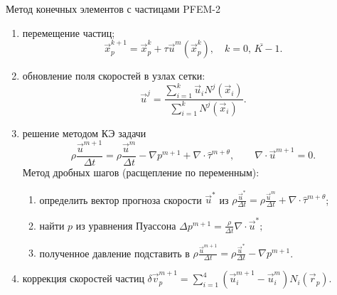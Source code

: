\documentclass[9pt, ignoreonframetext,unicode]{beamer}
\begin{document}
\begin{frame}{Метод конечных элементов с частицами PFEM-2}
	\begin{enumerate}
		\setlength{\parskip}{0.1pt}
		\item перемещение частиц;
				\[
		\vec{x}_p^{k+1} = \vec{x}_p^k+\tau \vec{u}^m (\vec{x}_p^k),\quad k=\overline{0,\,K-1}.
		\]
		
		\item обновление поля скоростей в узлах сетки:
		\[
		\vec{u}^j=\frac{\sum_{i=1}^k \vec{u}_i N^j(\vec{x}_i)}{\sum_{i=1}^k N^j(\vec{x}_i)}.
		\]
		\item решение методом КЭ задачи
		\begin{equation*}
			\rho\dfrac{ \vec{u}^{m+1}}{\Delta t}=\rho \dfrac{\vec{u}^m}{\Delta t} -\nabla p^{m+1} + \nabla \cdot \hat{\tau}^{m+\theta},\qquad
			\nabla \cdot \vec{u}^{m+1} = 0.
		\end{equation*}
		Метод дробных шагов (расщепление по переменным):
		\begin{enumerate}
			\setlength{\parskip}{7pt}
			\item определить вектор прогноза скорости $\vec{u}^*$ из $\rho \frac{\vec{u}^{*}}{\Delta t}=\rho \frac{\vec{u}^m}{\Delta t}+ \nabla \cdot \hat{\tau}^{m+\theta}$;
			\item найти $p$ из уравнения Пуассона
			$
			\Delta p^{m+1}= \frac{\rho}{\Delta t} \nabla \cdot \vec{u}^{*};
			$
			\item полученное давление подставить в $\rho \frac{\vec{u}^{m+1}}{\Delta t}=\rho \frac{\vec{u}^*}{\Delta t}-\nabla p^{m+1}$.
		\end{enumerate}
		
		\item коррекция скоростей частиц $\delta \vec{v}_p^{m+1}=\sum_{i=1}^4 \left(\vec{u}^{m+1}_i-\vec{u}^m_i\right)N_i(\vec{r}_p).$
		
	\end{enumerate}
	
\end{frame}

%
%
%
\end{document}
